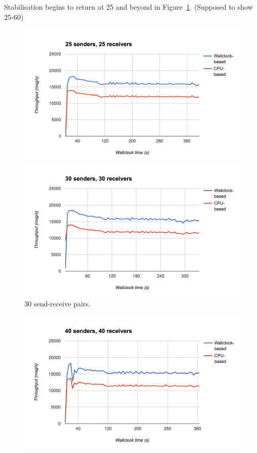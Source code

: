 Stabilisation begins to return at 25 and beyond in Figure~\ref{fig:lots}. (Supposed to show 25-60)
\begin{figure}
  \centering\includegraphics[width=\textwidth]{../transcripts/lipsum/25n25/graph.png}

  \centering\includegraphics[width=\textwidth]{../transcripts/lipsum/30n30/graph.png}
  \caption{30 send-receive pairs.}
  \label{fig:lots}
\end{figure}
\begin{figure}
  \centering\includegraphics[width=\textwidth]{../transcripts/lipsum/40n40/graph.png}
\end{figure}
